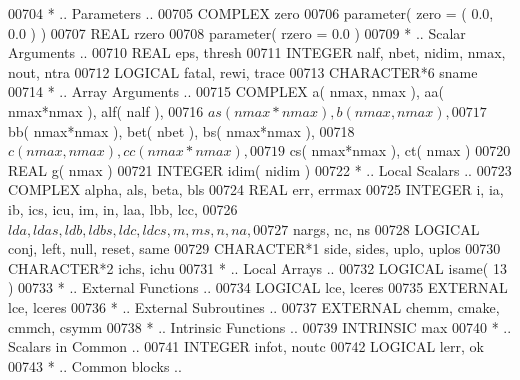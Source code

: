 \begin{DoxyCode}
00704 \textcolor{comment}{*     .. Parameters ..}
00705       \textcolor{keywordtype}{COMPLEX}            zero
00706       parameter( zero = ( 0.0, 0.0 ) )
00707       \textcolor{keywordtype}{REAL}               rzero
00708       parameter( rzero = 0.0 )
00709 \textcolor{comment}{*     .. Scalar Arguments ..}
00710       \textcolor{keywordtype}{REAL}               eps, thresh
00711       \textcolor{keywordtype}{INTEGER}            nalf, nbet, nidim, nmax, nout, ntra
00712       \textcolor{keywordtype}{LOGICAL}            fatal, rewi, trace
00713       \textcolor{keywordtype}{CHARACTER*6}        sname
00714 \textcolor{comment}{*     .. Array Arguments ..}
00715       \textcolor{keywordtype}{COMPLEX}            a( nmax, nmax ), aa( nmax*nmax ), alf( nalf ),
00716      $                   as( nmax*nmax ), b( nmax, nmax ),
00717      $                   bb( nmax*nmax ), bet( nbet ), bs( nmax*nmax ),
00718      $                   c( nmax, nmax ), cc( nmax*nmax ),
00719      $                   cs( nmax*nmax ), ct( nmax )
00720       \textcolor{keywordtype}{REAL}               g( nmax )
00721       \textcolor{keywordtype}{INTEGER}            idim( nidim )
00722 \textcolor{comment}{*     .. Local Scalars ..}
00723       \textcolor{keywordtype}{COMPLEX}            alpha, als, beta, bls
00724       \textcolor{keywordtype}{REAL}               err, errmax
00725       \textcolor{keywordtype}{INTEGER}            i, ia, ib, ics, icu, im, in, laa, lbb, lcc,
00726      $                   lda, ldas, ldb, ldbs, ldc, ldcs, m, ms, n, na,
00727      $                   nargs, nc, ns
00728       \textcolor{keywordtype}{LOGICAL}            conj, left, null, reset, same
00729       \textcolor{keywordtype}{CHARACTER*1}        side, sides, uplo, uplos
00730       \textcolor{keywordtype}{CHARACTER*2}        ichs, ichu
00731 \textcolor{comment}{*     .. Local Arrays ..}
00732       \textcolor{keywordtype}{LOGICAL}            isame( 13 )
00733 \textcolor{comment}{*     .. External Functions ..}
00734       \textcolor{keywordtype}{LOGICAL}            lce, lceres
00735       \textcolor{keywordtype}{EXTERNAL}           lce, lceres
00736 \textcolor{comment}{*     .. External Subroutines ..}
00737       \textcolor{keywordtype}{EXTERNAL}           chemm, cmake, cmmch, csymm
00738 \textcolor{comment}{*     .. Intrinsic Functions ..}
00739       \textcolor{keywordtype}{INTRINSIC}          max
00740 \textcolor{comment}{*     .. Scalars in Common ..}
00741       \textcolor{keywordtype}{INTEGER}            infot, noutc
00742       \textcolor{keywordtype}{LOGICAL}            lerr, ok
00743 \textcolor{comment}{*     .. Common blocks ..}

\end{DoxyCode}
